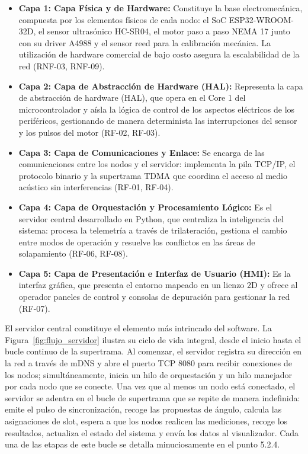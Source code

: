 \begin{itemize}[topsep=4pt, partopsep=0pt, itemsep=2pt, parsep=0pt]
    \item \textbf{Capa 1: Capa Física y de Hardware:} Constituye la base electromecánica, compuesta por los elementos físicos de cada nodo: el SoC ESP32-WROOM-32D, el sensor ultrasónico HC-SR04, el motor paso a paso NEMA 17 junto con su driver A4988 y el sensor reed para la calibración mecánica. La utilización de hardware comercial de bajo costo asegura la escalabilidad de la red (RNF-03, RNF-09).
    \item \textbf{Capa 2: Capa de Abstracción de Hardware (HAL):} Representa la capa de abstracción de hardware (HAL), que opera en el Core 1 del microcontrolador y aísla la lógica de control de los aspectos eléctricos de los periféricos, gestionando de manera determinista las interrupciones del sensor y los pulsos del motor (RF-02, RF-03).
    \item \textbf{Capa 3: Capa de Comunicaciones y Enlace:} Se encarga de las comunicaciones entre los nodos y el servidor: implementa la pila TCP/IP, el protocolo binario y la supertrama TDMA que coordina el acceso al medio acústico sin interferencias (RF-01, RF-04).
    \item \textbf{Capa 4: Capa de Orquestación y Procesamiento Lógico:} Es el servidor central desarrollado en Python, que centraliza la inteligencia del sistema: procesa la telemetría a través de trilateración, gestiona el cambio entre modos de operación y resuelve los conflictos en las áreas de solapamiento (RF-06, RF-08).
    \item \textbf{Capa 5: Capa de Presentación e Interfaz de Usuario (HMI):} Es la interfaz gráfica, que presenta el entorno mapeado en un lienzo 2D y ofrece al operador paneles de control y consolas de depuración para gestionar la red (RF-07).
\end{itemize}


El servidor central constituye el elemento más intrincado del software. La Figura~\ref{fig:flujo_servidor} ilustra su ciclo de vida integral, desde el inicio hasta el bucle continuo de la supertrama. Al comenzar, el servidor registra su dirección en la red a través de mDNS y abre el puerto TCP 8080 para recibir conexiones de los nodos; simultáneamente, inicia un hilo de orquestación y un hilo manejador por cada nodo que se conecte. Una vez que al menos un nodo está conectado, el servidor se adentra en el bucle de supertrama que se repite de manera indefinida: emite el pulso de sincronización, recoge las propuestas de ángulo, calcula las asignaciones de slot, espera a que los nodos realicen las mediciones, recoge los resultados, actualiza el estado del sistema y envía los datos al visualizador. Cada una de las etapas de este bucle se detalla minuciosamente en el punto 5.2.4.

